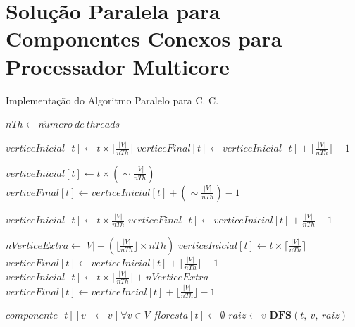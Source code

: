 \documentclass[12pt]{article}
\begin{document}
\section{Solução Paralela para Componentes Conexos para Processador Multicore}

{\color{gray}\lipsum[1]}

\begin{algorithm}[H]
    \DontPrintSemicolon
    \caption{Implementação do Algoritmo Paralelo para C. C.}
    {
        $nTh \gets n\acute{u}mero\ de\ threads$\;

		\;
        {
        	$verticeInicial[t] \gets t \times \lfloor \frac{|V|}{nTh} \rceil$\;
        	$verticeFinal[t] \gets verticeInicial[t] + \lfloor \frac{|V|}{nTh} \rceil-1$\;
        }
        
        \;
        {
        	$verticeInicial[t] \gets t \times (\sim \frac{|V|}{nTh})$\;
        	$verticeFinal[t] \gets verticeInicial[t] + (\sim \frac{|V|}{nTh})-1$\;
        }
        
        \;
        {
        	$verticeInicial[t] \gets t \times \frac{|V|}{nTh}$\;
        	$verticeFinal[t] \gets verticeInicial[t] +\frac{|V|}{nTh}-1$\;
        }
        
        \;
        $nVerticeExtra \gets |V| - (\lfloor \frac{|V|}{nTh} \rfloor \times nTh)$\;
        {
            {
                $verticeInicial[t] \gets t \times \lceil \frac{|V|}{nTh} \rceil$\;
                $verticeFinal[t] \gets verticeInicial[t] + \lceil \frac{|V|}{nTh} \rceil - 1$\;
            }
           {
                $verticeInicial[t] \gets t \times \lfloor \frac{|V|}{nTh} \rfloor + nVerticeExtra$\;
                $verticeFinal[t] \gets verticeIncial[t] + \lfloor \frac{|V|}{nTh} \rfloor - 1$\;
            }
        }
        {
        
            $componente[t][v] \gets v \mid \forall v \in V$\;
            $floresta[t] \gets \emptyset$\;
            {
                {
                    $raiz \gets v$\;
                    $\textbf{DFS}(t,\ v,\ raiz)$\;
                }
            }
        }
        
}
\end{algorithm}
\end{document}
